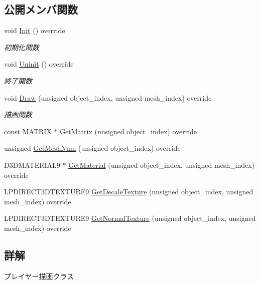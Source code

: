 \subsection*{公開メンバ関数}
\begin{DoxyCompactItemize}
\item 
void \mbox{\hyperlink{class_player_draw_ad79a0fbeb618e0913822b573e5d0be68}{Init}} () override
\begin{DoxyCompactList}\small\item\em 初期化関数 \end{DoxyCompactList}\item 
void \mbox{\hyperlink{class_player_draw_a917b2947914287f23d87ca75cd68f553}{Uninit}} () override
\begin{DoxyCompactList}\small\item\em 終了関数 \end{DoxyCompactList}\item 
void \mbox{\hyperlink{class_player_draw_a8b9e8caa6bea7295f58a0aaddeb9458b}{Draw}} (unsigned object\+\_\+index, unsigned mesh\+\_\+index) override
\begin{DoxyCompactList}\small\item\em 描画関数 \end{DoxyCompactList}\item 
const \mbox{\hyperlink{_vector3_d_8h_a032295cd9fb1b711757c90667278e744}{M\+A\+T\+R\+IX}} $\ast$ \mbox{\hyperlink{class_player_draw_a8edf1441ea23f298c6a0ca707f54021a}{Get\+Matrix}} (unsigned object\+\_\+index) override
\item 
unsigned \mbox{\hyperlink{class_player_draw_ad9e2e09a32c7474fcea5e7e24e22bc71}{Get\+Mesh\+Num}} (unsigned object\+\_\+index) override
\item 
D3\+D\+M\+A\+T\+E\+R\+I\+A\+L9 $\ast$ \mbox{\hyperlink{class_player_draw_ae818d3adaf5120845c2a78c230b5365e}{Get\+Material}} (unsigned object\+\_\+index, unsigned mesh\+\_\+index) override
\item 
L\+P\+D\+I\+R\+E\+C\+T3\+D\+T\+E\+X\+T\+U\+R\+E9 \mbox{\hyperlink{class_player_draw_a6cecfb28942044efff0b9d6213b511a5}{Get\+Decale\+Texture}} (unsigned object\+\_\+index, unsigned mesh\+\_\+index) override
\item 
L\+P\+D\+I\+R\+E\+C\+T3\+D\+T\+E\+X\+T\+U\+R\+E9 \mbox{\hyperlink{class_player_draw_abb93b530e38fc224ecbfe17d623f10fb}{Get\+Normal\+Texture}} (unsigned object\+\_\+index, unsigned mesh\+\_\+index) override
\end{DoxyCompactItemize}


\subsection{詳解}
プレイヤー描画クラス 

